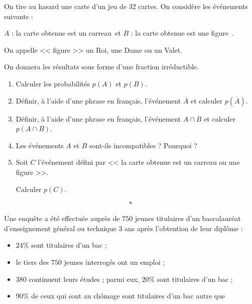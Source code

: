 \documentclass[10pt,openright,twoside,french]{book}
\begin{document}
\small\vspace*{-1.75cm}

\exo On tire au hasard une carte d'un jeu de 32 cartes. On considère les événements suivants :\par
$A$ : \og la carte obtenue est un carreau~\fg et $B$ : \og la carte obtenue est une figure~\fg.\par
On appelle << figure >> un Roi, une Dame ou un Valet.\smallskip

On donnera les résultats sous forme d'une fraction irréductible.\smallskip

\begin{enumerate}
    \item Calculer les probabilités $p(A)$ et $p(B)$.
    \item Définir, à l'aide d'une phrase en français, l'événement $\overline A$ et calculer $p\left(\overline A\right)$.
    \item Définir, à l'aide d'une phrase en français, l'événement $A \cap B$ et calculer $p\left(A \cap B\right)$.
    \item Les événements $A$ et $B$ sont-ils incompatibles ? Pourquoi ?
    \item Soit $C$ l'événement défini par << la carte obtenue est un carreau ou une figure >>.\par Calculer $p(C)$.
\end{enumerate}

\[*\]

\exo Une enquête a été effectuée auprès de $750$ jeunes titulaires d'un baccalauréat d'enseignement général ou technique 3 ans après l'obtention de leur diplôme :
\begin{itemize}
    \item $24\%$ sont titulaires d'un bac  ;
    \item le tiers des $750$ jeunes interrogés ont un emploi ;
    \item $380$ continuent leurs études ; parmi eux, $20\%$ sont titulaires d'un bac  ;
    \item $90\%$ de ceux qui sont au chômage sont titulaires d'un bac autre que 
\end{itemize}
\end{document}
